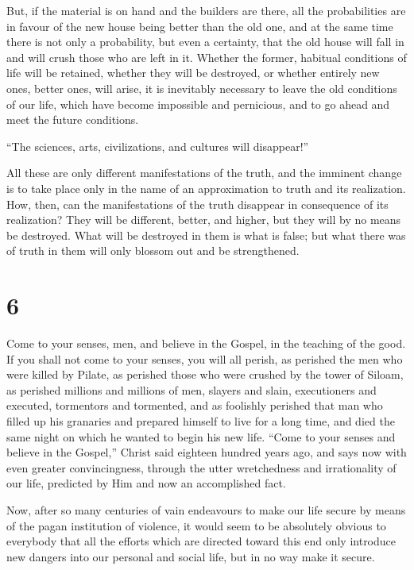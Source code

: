 \documentclass{book}
\begin{document}
But, if the material is on hand and the builders are there, all the probabilities are in favour of the new house being better than the old one, and at the same time there is not only a probability, but even a certainty, that the old house will fall in and will crush those who are left in it. Whether the former, habitual conditions of life will be retained, whether they will be destroyed, or whether entirely new ones, better ones, will arise, it is inevitably necessary to leave the old conditions of our life, which have become impossible and pernicious, and to go ahead and meet the future conditions.

“The sciences, arts, civilizations, and cultures will disappear!”

All these are only different manifestations of the truth, and the imminent change is to take place only in the name of an approximation to truth and its realization. How, then, can the manifestations of the truth disappear in consequence of its realization? They will be different, better, and higher, but they will by no means be destroyed. What will be destroyed in them is what is false; but what there was of truth in them will only blossom out and be strengthened.

\section*{6}
Come to your senses, men, and believe in the Gospel, in the teaching of the good. If you shall not come to your senses, you will all perish, as perished the men who were killed by Pilate, as perished those who were crushed by the tower of Siloam, as perished millions and millions of men, slayers and slain, executioners and executed, tormentors and tormented, and as foolishly perished that man who filled up his granaries and prepared himself to live for a long time, and died the same night on which he wanted to begin his new life. “Come to your senses and believe in the Gospel,” Christ said eighteen hundred years ago, and says now with even greater convincingness, through the utter wretchedness and irrationality of our life, predicted by Him and now an accomplished fact.

Now, after so many centuries of vain endeavours to make our life secure by means of the pagan institution of violence, it would seem to be absolutely obvious to everybody that all the efforts which are directed toward this end only introduce new dangers into our personal and social life, but in no way make it secure.
\end{document}
